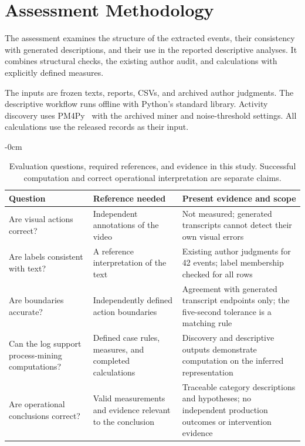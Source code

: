 \section{Assessment Methodology}
\label{sec:methods}
The assessment examines the structure of the extracted events, their consistency with generated descriptions, and their use in the reported descriptive analyses. It combines structural checks, the existing author audit, and calculations with explicitly defined measures.

The inputs are frozen texts, reports, CSVs, and archived author judgments. The descriptive workflow runs offline with Python's standard library. Activity discovery uses PM4Py~\cite{berti2023pm4py} with the archived miner and noise-threshold settings. All calculations use the released records as their input.

\begin{table}[!t]\begin{adjustwidth}{-\extralength}{0cm}
\caption{Evaluation questions, required references, and evidence in this study. Successful computation and correct operational interpretation are separate claims.}
\label{tab:evaluation_scope}\footnotesize
\begin{tabularx}{\linewidth}{@{}LLL@{}}\toprule
Question & Reference needed & Present evidence and scope \\\midrule
Are visual actions correct? & Independent annotations of the video & Not measured; generated transcripts cannot detect their own visual errors \\
Are labels consistent with text? & A reference interpretation of the text & Existing author judgments for 42 events; label membership checked for all rows \\
Are boundaries accurate? & Independently defined action boundaries & Agreement with generated transcript endpoints only; the five-second tolerance is a matching rule \\
Can the log support process-mining computations? & Defined case rules, measures, and completed calculations & Discovery and descriptive outputs demonstrate computation on the inferred representation \\
Are operational conclusions correct? & Valid measurements and evidence relevant to the conclusion & Traceable category descriptions and hypotheses; no independent production outcomes or intervention evidence \\
\bottomrule\end{tabularx}
\end{adjustwidth}\end{table}

